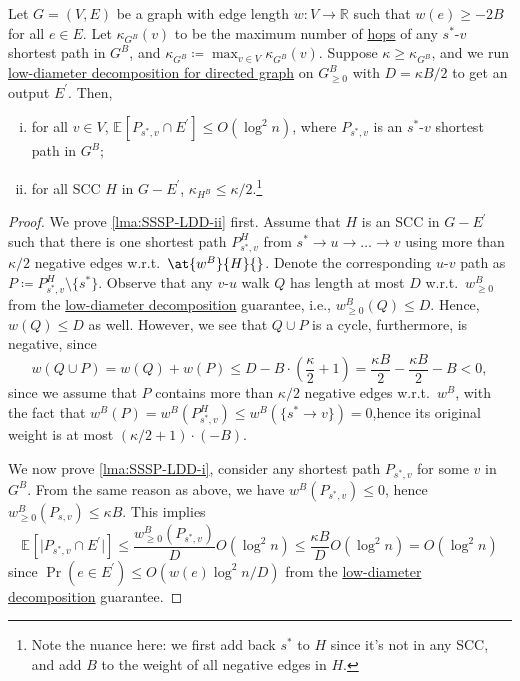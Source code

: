 \begin{lemma}\label{lma:SSSP-LDD}
	Let \(G = (V, E)\) be a graph with edge length \(w \colon V \to \mathbb{R} \) such that \(w(e) \geq -2B\) for all \(e \in E\). Let \(\kappa _{G^B}(v)\) to be the maximum number of \hyperref[not:hop]{hops} of any \(s^{\ast} \)-\(v\) shortest path in \(G^B\), and \(\kappa _{G^B}\coloneqq \max _{v \in V} \kappa _{G^B}(v)\). Suppose \(\kappa \geq \kappa _{G^B}\), and we run \hyperref[thm:directed-LDD]{low-diameter decomposition for directed graph} on \(G_{\geq 0}^B\) with \(D = \kappa B / 2\) to get an output \(E^{\prime} \). Then,
	\begin{enumerate}[(i)]
		\item\label{lma:SSSP-LDD-i} for all \(v \in V\), \(\mathbb{E}_{}[P_{s^{\ast} , v} \cap E^{\prime} ] \leq O(\log ^2 n)\), where \(P_{s^{\ast} , v}\) is an \(s^{\ast} \)-\(v\) shortest path in \(G^B\);
		\item\label{lma:SSSP-LDD-ii} for all SCC \(H\) in \(G - E^{\prime} \), \(\kappa _{H^{B} } \leq \kappa / 2\).\footnote{Note the nuance here: we first add back \(s^{\ast} \) to \(H\) since it's not in any SCC, and add \(B\) to the weight of all negative edges in \(H\).}
	\end{enumerate}
\end{lemma}
\begin{proof}
	We prove \autoref{lma:SSSP-LDD-ii} first. Assume that \(H\) is an SCC in \(G - E^{\prime} \) such that there is one shortest path \(P^H_{s^{\ast} , v}\) from \(s^{\ast} \to u \to \dots \to v\) using more than \(\kappa / 2\) negative edges w.r.t.\ \(\at{w^B}{H}{} \). Denote the corresponding \(u\)-\(v\) path as \(P \coloneqq P^H_{s^{\ast} , v} \setminus \{ s^{\ast} \}\). Observe that any \(v\)-\(u\) walk \(Q\) has length at most \(D\) w.r.t.\ \(w_{\geq 0}^B\) from the \hyperref[thm:directed-LDD]{low-diameter decomposition} guarantee, i.e., \(w_{\geq 0}^B(Q) \leq D\). Hence, \(w(Q) \leq D\) as well. However, we see that \(Q \cup P\) is a cycle, furthermore, is negative, since
	\[
		w(Q \cup P)
		= w(Q) + w(P)
		\leq D - B \cdot \left( \frac{\kappa }{2} + 1\right)
		= \frac{\kappa B}{2} - \frac{\kappa B}{2} - B
		< 0,
	\]
	since we assume that \(P\) contains more than \(\kappa / 2\) negative edges w.r.t.\ \(w^B\), with the fact that \(w^B(P) = w^B(P^H_{s^{\ast} , v}) \leq w^B(\{ s^{\ast} \to v \} ) = 0\),hence its original weight is at most \((\kappa / 2 + 1) \cdot (-B)\).

	We now prove \autoref{lma:SSSP-LDD-i}, consider any shortest path \(P_{s^{\ast} , v}\) for some \(v\) in \(G^B\). From the same reason as above, we have \(w^B(P_{s^{\ast} , v}) \leq 0\), hence \(w^B_{\geq 0}(P_{s, v}) \leq \kappa B\). This implies
	\[
		\mathbb{E}_{}[\lvert P_{s^{\ast} , v} \cap E^{\prime}  \rvert ]
		\leq \frac{w_{\geq 0}^B(P_{s^{\ast} , v})}{D} O(\log ^2 n)
		\leq \frac{\kappa B}{D} O(\log ^2 n)
		= O(\log ^2 n)
	\]
	since \(\Pr(e \in E^{\prime} ) \leq O(w(e) \log ^2 n / D)\) from the \hyperref[thm:directed-LDD]{low-diameter decomposition} guarantee.
\end{proof}

